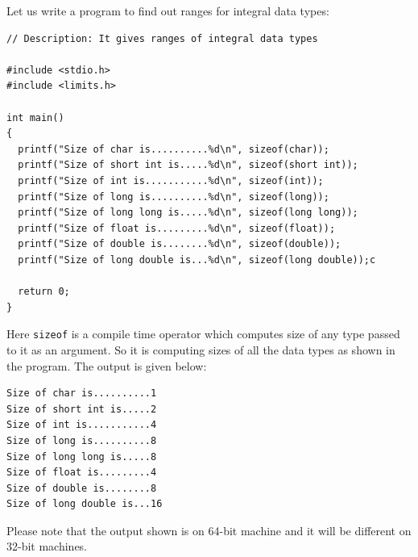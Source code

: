 Let us write a program to find out ranges for integral data types:

\begin{Verbatim}[frame=single]
// Description: It gives ranges of integral data types

#include <stdio.h>
#include <limits.h>

int main()
{
  printf("Size of char is..........%d\n", sizeof(char));
  printf("Size of short int is.....%d\n", sizeof(short int));
  printf("Size of int is...........%d\n", sizeof(int));
  printf("Size of long is..........%d\n", sizeof(long));
  printf("Size of long long is.....%d\n", sizeof(long long));
  printf("Size of float is.........%d\n", sizeof(float));
  printf("Size of double is........%d\n", sizeof(double));
  printf("Size of long double is...%d\n", sizeof(long double));c

  return 0;
}
\end{Verbatim}

Here \texttt{sizeof} is a compile time operator which computes size of any type
passed to it as an argument. So it is computing sizes of all the data types as
shown in the program. The output is given below:

\begin{Verbatim}[frame=single]
Size of char is..........1
Size of short int is.....2
Size of int is...........4
Size of long is..........8
Size of long long is.....8
Size of float is.........4
Size of double is........8
Size of long double is...16
\end{Verbatim}

Please note that the output shown is on 64-bit machine and it will be different
on 32-bit machines.

